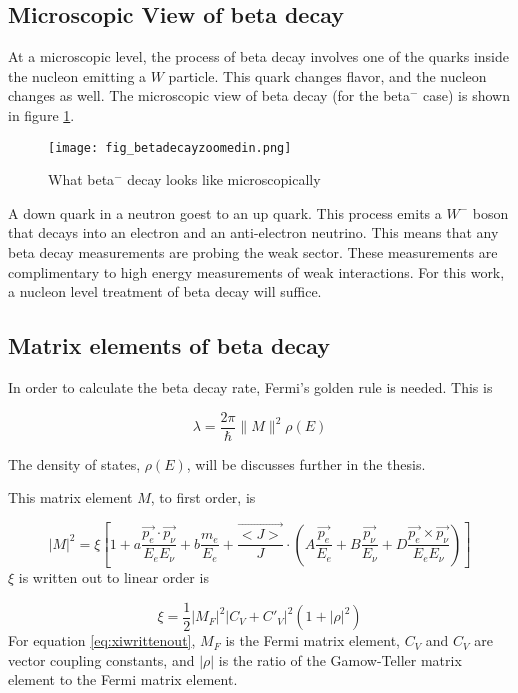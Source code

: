 \documentclass[../MaxHughesThesis.tex]{subfiles}
\begin{document}
\subsection{Microscopic View of beta decay}
At a microscopic level, the process of beta decay involves one of the quarks inside the nucleon emitting a $W$ particle.
This quark changes flavor, and the nucleon changes as well. 
The microscopic view of beta decay (for the beta$^{-}$ case) is shown in figure \ref{fig:betadecaymicro}.

\begin{figure}[!htb]
	\centerline{\texttt{[image: fig\_betadecayzoomedin.png]}}
	\caption{What beta$^{-}$ decay looks like microscopically}
	\label{fig:betadecaymicro}
\end{figure}
A down quark in a neutron goest to an up quark.
This process emits a $W^{-}$ boson that decays into an electron and an anti-electron neutrino.
This means that any beta decay measurements are probing the weak sector. 
These measurements are complimentary to high energy measurements of weak interactions.
For this work, a nucleon level treatment of beta decay will suffice.  

\subsection{Matrix elements of beta decay}
In order to calculate the beta decay rate, Fermi's golden rule is needed.
This is %

\begin{equation}
	\lambda = \frac{2\pi}{\hbar}\|M\|^{2}\rho(E)
	\label{eq:fgr}
\end{equation}

The density of states, $\rho(E)$, will be discusses further in the thesis. 

This matrix element $M$, to first order, is \cite{Gon19} %

\begin{equation}
	|M|^{2} = \xi [1 + a \frac{\vec{p_{e}} \cdot \vec{p_{\nu}}} {E_{e} E_{\nu}}  +  b \frac{m_{e}}{E_{e}} + \frac{\vec{<J>}}{J} \cdot (A \frac{ \vec{p_{e}} }{E_{e}} + B \frac{\vec{p_{\nu}}}{E_{\nu}} + D \frac{\vec{p_{e}} \times \vec{p_{\nu}}}{E_{e} E_{\nu}})]
	\label{eq:matrixelement}
\end{equation}
$\xi$ is written out to linear order is %
 
\begin{equation}
	\xi = \frac{1}{2} |M_{F}|^{2} |C_{V} + C'_{V}|^{2} (1 + |\rho|^{2})
	\label{eq:xiwrittenout}
\end{equation}
For equation \ref{eq:xiwrittenout}, $M_{F}$ is the Fermi matrix element, $C_{V}$ and $C_{V}$ are vector coupling constants, and $|\rho|$ is the ratio of the Gamow-Teller matrix element to the Fermi matrix element.
\cite{Gon19}
\end{document}
